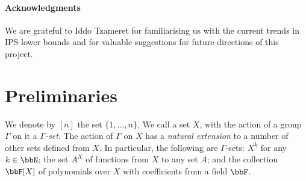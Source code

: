 \documentclass[10pt,a4paper]{article}
\begin{document}
	
	\paragraph*{Acknowledgments} We are grateful to Iddo Tzameret for familiarising us with the current trends in IPS lower bounds and for valuable suggestions for future directions of this project.
	
	
	
	
	
	
	
	
	\section{Preliminaries}\label{sec:preliminaries}
	We denote by $[n]$ the set $\{1,...,n\}$.  We call a set $X$, with the action of a group $\Gamma$ on it a \emph{$\Gamma$-set}.  The action of $\Gamma$ on $X$ has a \emph{natural extension} to a number of other sets defined from $X$.  In particular, the following are $\Gamma$-sets: $X^k$ for any $k \in \bbN$; the set $A^X$ of functions from $X$ to any set $A$; and the collection $\bbF[X]$ of polynomials over $X$ with coefficients from a field $\bbF$.
	
\end{document}
